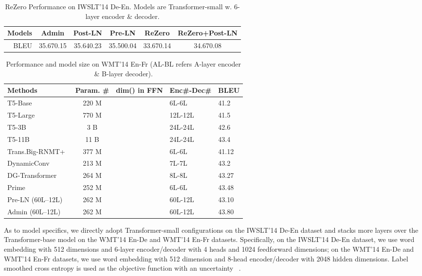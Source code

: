 \documentclass[11pt,a4paper]{article}
\begin{document}
\begin{table}[t]
\centering
\caption{ReZero Performance on IWSLT'14 De-En. Models are Transformer-small w. 6-layer encoder \& decoder.}
\label{tab:rezero}
\begin{tabular}{r|ccccc}
\toprule
Models & Admin & Post-LN & Pre-LN & ReZero & ReZero+Post-LN \\
\midrule
BLEU & 35.670.15 & 35.640.23 & 35.500.04 & 33.670.14 & 34.670.08 \\
\bottomrule
\end{tabular}
\end{table}

\begin{table}[t]
\centering
\caption{Performance and model size on WMT'14 En-Fr (AL-BL refers A-layer encoder \& B-layer decoder).}
\label{tab:wmt14fr}
\begin{tabularx}{\linewidth}{lccYY}
\toprule
Methods & Param. \# & dim() in FFN & Enc\#-Dec\# & BLEU \\
\midrule
T5-Base~\cite{raffel2019exploring} & 220 M &  & 6L-6L & 41.2 \\
T5-Large~\cite{raffel2019exploring} & 770 M &  & 12L-12L & 41.5 \\
T5-3B~\cite{raffel2019exploring} & 3 B &  & 24L-24L & 42.6 \\
T5-11B~\cite{raffel2019exploring} & 11 B &  & 24L-24L & 43.4 \\
\midrule
Trans.Big-RNMT+~\cite{Chen2018TheBO} & 377 M &   & 6L-6L & 41.12 \\
DynamicConv~\cite{wu2018pay} & 213 M &  & 7L-7L & 43.2 \\
DG-Transformer~\cite{Wu2019DepthGF} & 264 M &  & 8L-8L & 43.27 \\
Prime~\cite{zhao2019muse} & 252 M &  & 6L-6L & 43.48 \\
\midrule
Pre-LN (60L--12L) & 262 M &   & 60L-12L & 43.10 \\
Admin (60L--12L) & 262 M &  & 60L-12L & 43.80 \\
\bottomrule
\end{tabularx}
\end{table}

As to model specifics, we directly adopt Transformer-small configurations on the IWSLT'14 De-En dataset and stacks more layers over the Transformer-base model on the WMT'14 En-De and WMT'14 En-Fr datasets.
Specifically, on the IWSLT'14 De-En dataset, we use word embedding with 512 dimensions and 6-layer encoder/decoder with 4 heads and 1024 feedforward dimensions; on the WMT'14 En-De and WMT'14 En-Fr datasets, we use word embedding with 512 dimension and 8-head encoder/decoder with 2048 hidden dimensions. 
Label smoothed cross entropy is used as the objective function with an uncertainty ~\citep{szegedy2016rethinking}. 
\end{document}
